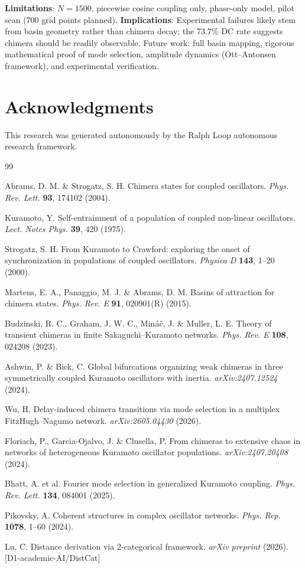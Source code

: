 \documentclass[12pt]{article}
\begin{document}
\textbf{Limitations}: $N=1500$, piecewise cosine coupling only, phase-only model, pilot scan (700 grid points planned). \textbf{Implications}: Experimental failures likely stem from basin geometry rather than chimera decay; the 73.7\% DC rate suggests chimera should be readily observable. Future work: full basin mapping, rigorous mathematical proof of mode selection, amplitude dynamics (Ott--Antonsen framework), and experimental verification.

\section*{Acknowledgments}

This research was generated autonomously by the Ralph Loop autonomous research framework.


\begin{thebibliography}{99}

Abrams, D. M. \& Strogatz, S. H. Chimera states for coupled oscillators.
\textit{Phys. Rev. Lett.} \textbf{93}, 174102 (2004).

Kuramoto, Y. Self-entrainment of a population of coupled non-linear oscillators.
\textit{Lect. Notes Phys.} \textbf{39}, 420 (1975).

Strogatz, S. H. From Kuramoto to Crawford: exploring the onset of synchronization
in populations of coupled oscillators. \textit{Physica D} \textbf{143}, 1--20 (2000).

Martens, E. A., Panaggio, M. J. \& Abrams, D. M. Basins of attraction for
chimera states. \textit{Phys. Rev. E} \textbf{91}, 020901(R) (2015).

Budzinski, R. C., Graham, J. W. C., Min\'{a}\v{c}, J. \& Muller, L. E. Theory of
transient chimeras in finite Sakaguchi--Kuramoto networks. \textit{Phys. Rev. E}
\textbf{108}, 024208 (2023).

Ashwin, P. \& Bick, C. Global bifurcations organizing weak chimeras in
three symmetrically coupled Kuramoto oscillators with inertia.
\textit{arXiv:2407.12524} (2024).

Wu, H. Delay-induced chimera transitions via mode selection in a
multiplex FitzHugh--Nagumo network. \textit{arXiv:2605.04430} (2026).

Floriach, P., Garcia-Ojalvo, J. \& Clusella, P. From chimeras to extensive
chaos in networks of heterogeneous Kuramoto oscillator populations.
\textit{arXiv:2407.20408} (2024).

Bhatt, A. et al. Fourier mode selection in generalized Kuramoto coupling.
\textit{Phys. Rev. Lett.} \textbf{134}, 084001 (2025).

Pikovsky, A. Coherent structures in complex oscillator networks.
\textit{Phys. Rep.} \textbf{1078}, 1--60 (2024).

Lu, C. Distance derivation via 2-categorical framework.
\textit{arXiv preprint} (2026). [D1-academic-AI/DistCat]

\end{thebibliography}
\end{document}

